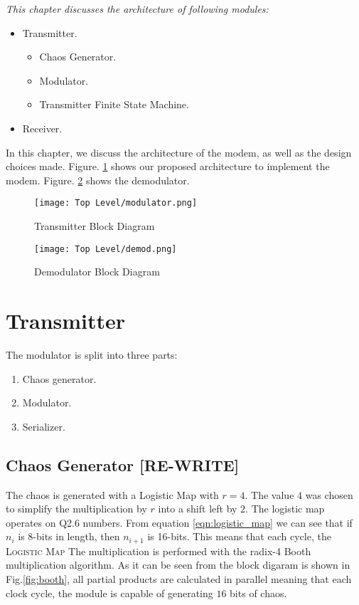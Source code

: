 \vfill
\textit{This chapter discusses the architecture of following modules:}
\begin{itemize}
    \item Transmitter.
    \begin{itemize}
        \item Chaos Generator.
        \item Modulator.
        \item Transmitter Finite State Machine.
    \end{itemize}
    \item Receiver.

\end{itemize}
\vfill


\newpage
In this chapter, we discuss the architecture of the modem, as well as the design choices made. Figure. \ref{fig:full_mod} shows our proposed architecture to implement the modem. Figure. \ref{fig:dmod} shows the demodulator.


\begin{figure}[p]
    \label{fig:full_mod}
    \caption{Transmitter Block Diagram}
    \texttt{[image: Top Level/modulator.png]}
\end{figure}

\begin{figure}[p]
    \label{fig:dmod}
    \caption{Demodulator Block Diagram}
    \texttt{[image: Top Level/demod.png]}
\end{figure}

\section{Transmitter}
The modulator is split into three parts:
\begin{enumerate}
    \item Chaos generator.
    \item Modulator.
    \item Serializer.
\end{enumerate}

\subsection{Chaos Generator [RE-WRITE]}
The chaos is generated with a Logistic Map with $r = 4$. The value $4$ was chosen to simplify the multiplication by $r$ into a shift left by
$2$. The logistic map operates on Q2.6 numbers. From equation \ref{eqn:logistic_map} we can see that if $n_{i}$ is 8-bits in length,
then $n_{i+1}$ is 16-bits. This means that each cycle, the \textsc{Logistic Map} The multiplication is performed with the radix-4 Booth multiplication algorithm. As it
can be seen from the block digaram is shown in Fig.\ref{fig:booth}, all partial products are calculated in parallel meaning that each clock cycle, the module is capable
of generating $16$ bits of chaos.

